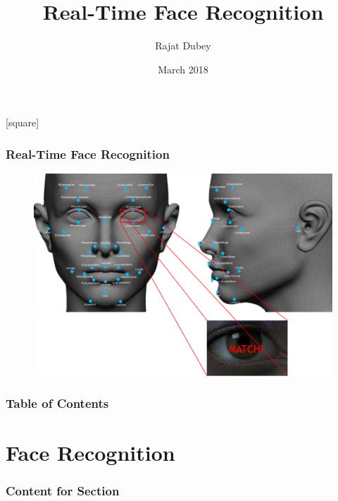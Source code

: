 \documentclass[xcolor=dvipsnames]{beamer}
\begin{document}
    \title[Real-Time Face Recognition]{Real-Time Face Recognition}
    \author[Rajat Dubey]{Rajat Dubey}
    \date{March 2018}
    \begin{frame}
        \titlepage
    \end{frame}
    [square]
    
    \begin{frame}
    \frametitle{Real-Time Face Recognition}
    \begin{figure}[H]
    \graphicspath{{figs/}}
    \includegraphics[width=1.0\textwidth]{Facial.png}
    \caption{}
    \end{figure}
    \end{frame}
    
    \begin{frame}
        \frametitle{Table of Contents}
        \tableofcontents
    \end{frame}

    \section{Face Recognition}
    \begin{frame}
      \frametitle{Content for Section \thesection}
      \tableofcontents[currentsection]
    \end{frame}
\end{document}

